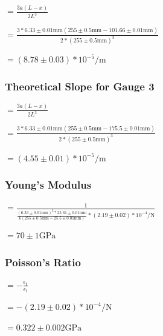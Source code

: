 \documentclass[]{article}
\newcommand{\gaugeTwoTheoretical}{\ensuremath{(8.78 \pm 0.03) * 10^{-5} \si{\per\meter}}}
\newcommand{\gaugeThreeTheoretical}{\ensuremath{(4.55 \pm 0.01) * 10^{-5} \si{\per\meter}}}
\newcommand{\weightSlope}{\ensuremath{(2.19 \pm 0.02) * 10^{-4} \si{\per\newton}}}
\newcommand{\youngsMeasured}{\ensuremath{70 \pm 1 \si{\giga\pascal}}}
\newcommand{\poissonMeasured}{\ensuremath{0.322 \pm 0.002} \si{\giga\pascal}}
\newcommand{\xOne}{\ensuremath{25.5 \pm 0.01 \si{\milli\meter}}}
\newcommand{\xTwo}{\ensuremath{101.66 \pm 0.01 \si{\milli\meter}}}
\newcommand{\xThree}{\ensuremath{175.5 \pm 0.01 \si{\milli\meter}}}
\newcommand{\LOne}{\ensuremath{255 \pm 0.5 \si{\milli\meter}}}
\newcommand{\aOne}{\ensuremath{6.33 \pm 0.01 \si{\milli\meter}}}
\newcommand{\bOne}{\ensuremath{25.61 \pm 0.01 \si{\milli\meter}}}
\begin{document}
$= \frac{3a(L-x)}{2L^3}$

$= \frac{3 * \aOne (\LOne - \xTwo)}{2 * {(\LOne)}^3}$

$ = \gaugeTwoTheoretical$

\subsubsection{Theoretical Slope for Gauge 3}

$= \frac{3a(L-x)}{2L^3}$ 

$= \frac{3 * \aOne (\LOne - \xThree)}{2 * {(\LOne)}^3}$

$ = \gaugeThreeTheoretical$

\subsubsection{Young's Modulus}

$= \frac{1}{\frac{{(\aOne)}^2 * \bOne}{6(\LOne-\xOne)} * \weightSlope}$

$= \youngsMeasured$

\subsubsection{Poisson's Ratio}

$= -\frac{\epsilon_t}{\epsilon_l} $

$= -\weightSlope $

$= \poissonMeasured$


\end{document}
